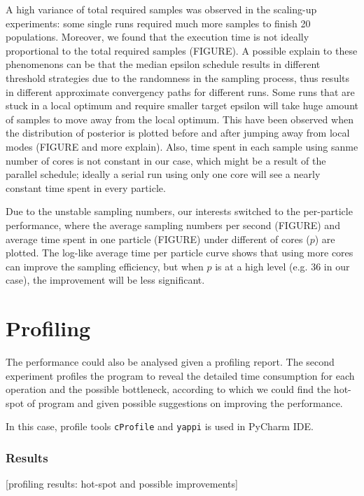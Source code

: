 \documentclass[12pt,a4paper]{report}
\begin{document}
A high variance of total required samples was observed in the scaling-up experiments: some single runs required much more samples to finish 20 populations. Moreover, we found that the execution time is not ideally proportional to the total required samples (FIGURE). A possible explain to these phenomenons can be that the median epsilon schedule results in different threshold strategies due to the randomness in the sampling process, thus results in different approximate convergency paths for different runs. Some runs that are stuck in a local optimum and require smaller target epsilon will take huge amount of samples to move away from the local optimum. This have been observed when the distribution of posterior is plotted before and after jumping away from local modes (FIGURE and more explain). Also, time spent in each sample using sanme number of cores is not constant in our case, which might be a result of the parallel schedule; ideally a serial run using only one core will see a nearly constant time spent in every particle.

Due to the unstable sampling numbers, our interests switched to the per-particle performance, where the average sampling numbers per second (FIGURE) and average time spent in one particle (FIGURE) under different of cores ($p$) are plotted. The log-like average time per particle curve shows that using more cores can improve the sampling efficiency, but when $p$ is at a high level (e.g. 36 in our case), the improvement will be less significant.

\section{Profiling}

The performance could also be analysed given a profiling report. The second experiment profiles the program to reveal the detailed time consumption for each operation and the possible bottleneck, according to which we could find the hot-spot of program and given possible suggestions on improving the performance. 

In this case, profile tools \verb|cProfile| and \verb|yappi| is used in PyCharm IDE.

\subsubsection{Results} 

[profiling results: hot-spot and possible improvements]
\end{document}
